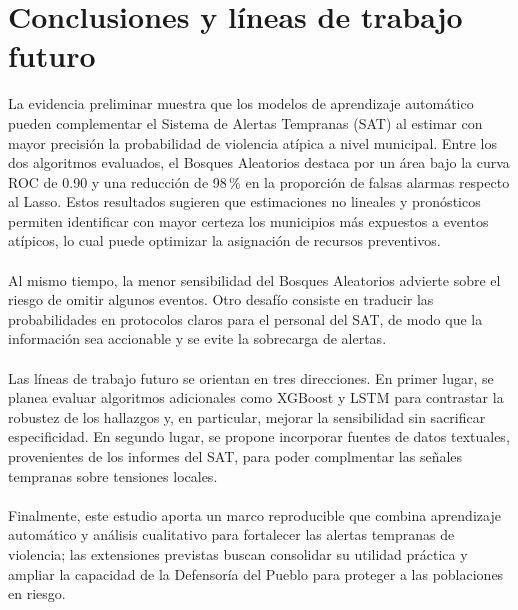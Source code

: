 \section{Conclusiones y líneas de trabajo futuro}

La evidencia preliminar muestra que los modelos de aprendizaje automático pueden complementar el {Sistema de Alertas Tempranas} (SAT) al estimar con mayor precisión la probabilidad de violencia atípica a nivel municipal. Entre los dos algoritmos evaluados, el {Bosques Aleatorios} destaca por un área bajo la curva ROC de 0.90 y una reducción de 98\,\% en la proporción de falsas alarmas respecto al Lasso. Estos resultados sugieren que estimaciones no lineales y pronósticos permiten identificar con mayor certeza los municipios más expuestos a eventos atípicos, lo cual puede optimizar la asignación de recursos preventivos.
\\\\
Al mismo tiempo, la menor sensibilidad del {Bosques Aleatorios} advierte sobre el riesgo de omitir algunos eventos. Otro desafío consiste en traducir las probabilidades en protocolos claros para el personal del SAT, de modo que la información sea accionable y se evite la sobrecarga de alertas.
\\\\
Las líneas de trabajo futuro se orientan en tres direcciones. En primer lugar, se planea evaluar algoritmos adicionales como XGBoost y LSTM para contrastar la robustez de los hallazgos y, en particular, mejorar la sensibilidad sin sacrificar especificidad. En segundo lugar, se propone incorporar fuentes de datos textuales, provenientes de los informes del SAT, para poder complmentar las señales tempranas sobre tensiones locales. 
\\\\
Finalmente, este estudio aporta un marco reproducible que combina aprendizaje automático y análisis cualitativo para fortalecer las alertas tempranas de violencia; las extensiones previstas buscan consolidar su utilidad práctica y ampliar la capacidad de la Defensoría del Pueblo para proteger a las poblaciones en riesgo.
